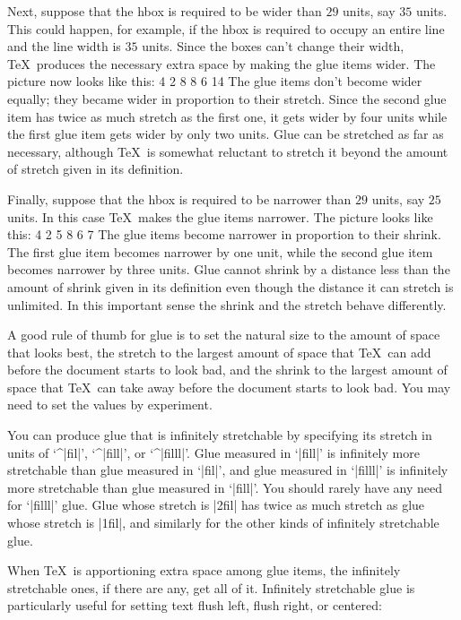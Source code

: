{{{{{{Next, suppose that the hbox is required to be wider than $29$ units, say
$35$ units.  This
could happen, for example, if the hbox is required to occupy an entire
line and the line width is $35$ units.
Since the boxes can't change their width, 
\TeX\ produces the necessary extra space by making the glue items wider.
The picture now looks like this:
 {  4 2 8   8 6 14  }
The glue items don't become wider equally; they became wider in proportion to
their stretch.  Since the second glue item 
has twice as much stretch as the first one, 
it gets wider by four units while the first glue item gets wider by only 
two units.
Glue can be stretched as far as necessary, although \TeX\ is
somewhat reluctant to
stretch it beyond the amount of stretch given in its definition.

Finally, suppose that the hbox is required to be narrower than $29$ units, say
$25$ units.  In this case \TeX\ makes the glue items narrower.
The picture looks like this:
 {  4 2 5   8 6 7  }
The glue items become narrower in proportion to their shrink.
The first glue item becomes narrower by one unit, while the second glue item
becomes narrower by three units.  Glue cannot shrink by a distance
less than the amount of shrink
given in its definition even though the distance it can stretch is
unlimited.  In this important sense the shrink and 
the stretch behave differently.

A good rule of thumb for glue is to set the natural size to the amount
of space that looks best, the stretch to the largest amount of space
that \TeX\ can add before the document starts to look bad, and the
shrink to the largest amount of space that \TeX\ can take away before
the document starts to look bad.  You may need to set the values by
experiment.

You can produce glue that is infinitely stretchable  by specifying
its stretch in units of `^|fil|', `^|fill|', or `^|filll|'.   Glue measured in
`|fill|' is infinitely more stretchable than glue measured in `|fil|', and
glue measured in `|filll|'  is infinitely more stretchable than glue measured
in `|fill|'.  You should rarely have any need for `|filll|' glue.  Glue whose
stretch is |2fil| has twice as much stretch as glue whose stretch is |1fil|,
and similarly for the other kinds of infinitely stretchable glue.

When \TeX\ is
apportioning extra space among glue items, the infinitely stretchable
ones, if there
are any, get all of it.  Infinitely stretchable glue is particularly useful for
setting text flush left, flush right, or centered:

}}}}}}
